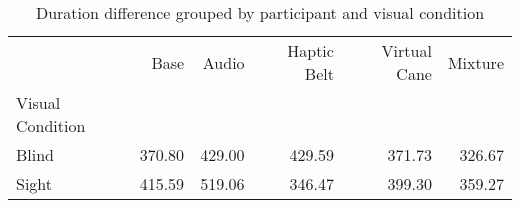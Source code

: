 
\begin{table}[!htb]
\centering
\caption{Duration difference grouped by participant and visual condition}
\label{tab:duracao_average_group}
\begin{tabular}{lrrrrr}
\toprule
{} &    Base &   Audio & Haptic Belt & Virtual Cane & Mixture \\
Visual Condition &         &         &             &              &         \\
\midrule
Blind            &  370.80 &  429.00 &      429.59 &       371.73 &  326.67 \\
Sight            &  415.59 &  519.06 &      346.47 &       399.30 &  359.27 \\
\bottomrule
\end{tabular}
\end{table}

